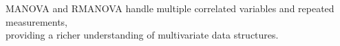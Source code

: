 \documentclass[preview]{standalone}
\begin{document}
\begin{center}
MANOVA and RMANOVA handle multiple correlated variables and repeated measurements,\\providing a richer understanding of multivariate data structures.
\end{center}
\end{document}
